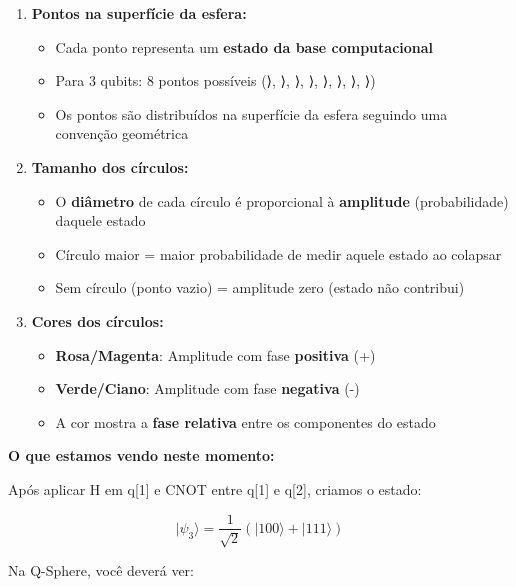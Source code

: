 \documentclass[
  brazilian,
]{report}
\providecommand{\tightlist}{%
  \setlength{\itemsep}{0pt}\setlength{\parskip}{0pt}}
\begin{document}
\begin{enumerate}
\def\labelenumi{\arabic{enumi}.}
\tightlist
\item
  \textbf{Pontos na superfície da esfera:}

  \begin{itemize}
  \tightlist
  \item
    Cada ponto representa um \textbf{estado da base computacional}
  \item
    Para 3 qubits: 8 pontos possíveis (⟩, ⟩,
    ⟩, ⟩, ⟩, ⟩,
    ⟩, ⟩)
  \item
    Os pontos são distribuídos na superfície da esfera seguindo uma
    convenção geométrica
  \end{itemize}
\item
  \textbf{Tamanho dos círculos:}

  \begin{itemize}
  \tightlist
  \item
    O \textbf{diâmetro} de cada círculo é proporcional à
    \textbf{amplitude} (probabilidade) daquele estado
  \item
    Círculo maior = maior probabilidade de medir aquele estado ao
    colapsar
  \item
    Sem círculo (ponto vazio) = amplitude zero (estado não contribui)
  \end{itemize}
\item
  \textbf{Cores dos círculos:}

  \begin{itemize}
  \tightlist
  \item
    \textbf{Rosa/Magenta}: Amplitude com fase \textbf{positiva} (+)
  \item
    \textbf{Verde/Ciano}: Amplitude com fase \textbf{negativa} (-)
  \item
    A cor mostra a \textbf{fase relativa} entre os componentes do estado
  \end{itemize}
\end{enumerate}

\textbf{O que estamos vendo neste momento:}

Após aplicar H em q{[}1{]} e CNOT entre q{[}1{]} e q{[}2{]}, criamos o
estado:

\[|\psi_3\rangle = \frac{1}{\sqrt{2}}(|100\rangle + |111\rangle)\]

Na Q-Sphere, você deverá ver:
\end{document}
